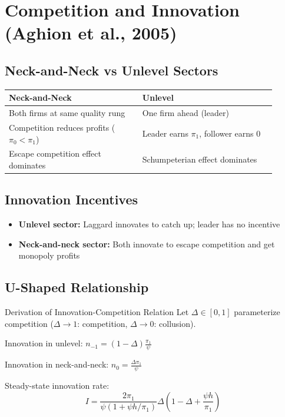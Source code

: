 \documentclass[a4paper,11pt]{article}
\begin{document}
\clearpage

\section{Competition and Innovation (Aghion et al., 2005)}

\subsection*{Neck-and-Neck vs Unlevel Sectors}
\begin{center}
\begin{tabular}{p{0.45\linewidth}p{0.45\linewidth}}
\toprule
\textbf{Neck-and-Neck} & \textbf{Unlevel} \\
\midrule
Both firms at same quality rung & One firm ahead (leader) \\
Competition reduces profits ($\pi_0 < \pi_1$) & Leader earns $\pi_1$, follower earns 0 \\
Escape competition effect dominates & Schumpeterian effect dominates \\
\bottomrule
\end{tabular}
\end{center}

\subsection*{Innovation Incentives}
\begin{itemize}
    \item \textbf{Unlevel sector:} Laggard innovates to catch up; leader has no incentive
    \item \textbf{Neck-and-neck sector:} Both innovate to escape competition and get monopoly profits
\end{itemize}

\subsection*{U-Shaped Relationship}
\begin{derivationbox}{Derivation of Innovation-Competition Relation}
Let $\Delta \in [0,1]$ parameterize competition ($\Delta \to 1$: competition, $\Delta \to 0$: collusion).

Innovation in unlevel: $n_{-1} = (1-\Delta)\frac{\pi_1}{\psi}$

Innovation in neck-and-neck: $n_0 = \frac{\Delta\pi_1}{\psi}$

Steady-state innovation rate:
\[
I = \frac{2\pi_1}{\psi(1 + \psi h/\pi_1)} \Delta\left(1 - \Delta + \frac{\psi h}{\pi_1}\right)
\]
\end{derivationbox}
\end{document}
